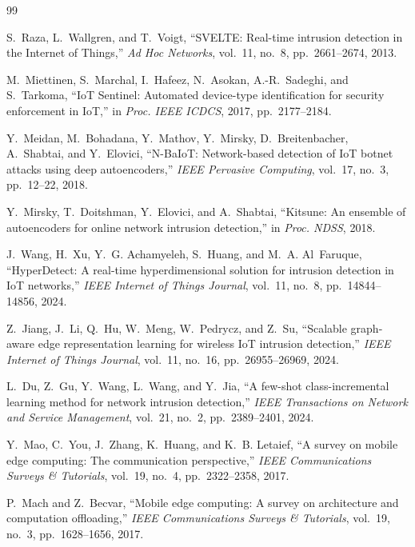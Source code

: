 \documentclass[10pt,journal]{IEEEtran}
\begin{document}
\begin{thebibliography}{99}

S.~Raza, L.~Wallgren, and T.~Voigt, ``SVELTE: Real-time intrusion detection in the Internet of Things,'' \emph{Ad Hoc Networks}, vol.~11, no.~8, pp.~2661--2674, 2013.

M.~Miettinen, S.~Marchal, I.~Hafeez, N.~Asokan, A.-R.~Sadeghi, and S.~Tarkoma, ``IoT Sentinel: Automated device-type identification for security enforcement in IoT,'' in \emph{Proc. IEEE ICDCS}, 2017, pp.~2177--2184.

Y.~Meidan, M.~Bohadana, Y.~Mathov, Y.~Mirsky, D.~Breitenbacher, A.~Shabtai, and Y.~Elovici, ``N-BaIoT: Network-based detection of IoT botnet attacks using deep autoencoders,'' \emph{IEEE Pervasive Computing}, vol.~17, no.~3, pp.~12--22, 2018.

Y.~Mirsky, T.~Doitshman, Y.~Elovici, and A.~Shabtai, ``Kitsune: An ensemble of autoencoders for online network intrusion detection,'' in \emph{Proc. NDSS}, 2018.

J.~Wang, H.~Xu, Y.~G. Achamyeleh, S.~Huang, and M.~A. Al~Faruque, ``HyperDetect: A real-time hyperdimensional solution for intrusion detection in IoT networks,'' \emph{IEEE Internet of Things Journal}, vol.~11, no.~8, pp.~14844--14856, 2024.

Z.~Jiang, J.~Li, Q.~Hu, W.~Meng, W.~Pedrycz, and Z.~Su, ``Scalable graph-aware edge representation learning for wireless IoT intrusion detection,'' \emph{IEEE Internet of Things Journal}, vol.~11, no.~16, pp.~26955--26969, 2024.

L.~Du, Z.~Gu, Y.~Wang, L.~Wang, and Y.~Jia, ``A few-shot class-incremental learning method for network intrusion detection,'' \emph{IEEE Transactions on Network and Service Management}, vol.~21, no.~2, pp.~2389--2401, 2024.

Y.~Mao, C.~You, J.~Zhang, K.~Huang, and K.~B. Letaief, ``A survey on mobile edge computing: The communication perspective,'' \emph{IEEE Communications Surveys \& Tutorials}, vol.~19, no.~4, pp.~2322--2358, 2017.

P.~Mach and Z.~Becvar, ``Mobile edge computing: A survey on architecture and computation offloading,'' \emph{IEEE Communications Surveys \& Tutorials}, vol.~19, no.~3, pp.~1628--1656, 2017.


\end{thebibliography}
\end{document}
